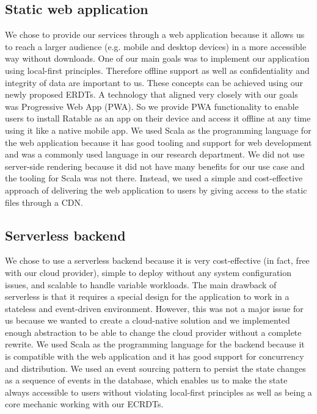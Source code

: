 \documentclass[
	english,
	ruledheaders=section,   %
	class=report,		    %
	thesis={type=bachelor}, %
	accentcolor=9c,			%
	custommargins=true,    %
	marginpar=false,        %
	parskip=half-,          %
	fontsize=11pt,          %
]{tudapub}
\begin{document}
\subsection{Static web application}
We chose to provide our services through a web application because it allows us to reach a larger audience (e.g. mobile and desktop devices) in a more accessible way without downloads. One of our main goals was to implement our application using local-first principles. Therefore offline support as well as confidentiality and integrity of data are important to us. These concepts can be achieved using our newly proposed ERDTs. A technology that aligned very closely with our goals was Progressive Web App (PWA). So we provide PWA functionality to enable users to install Ratable as an app on their device and access it offline at any time using it like a native mobile app. We used Scala as the programming language for the web application because it has good tooling and support for web development and was a commonly used language in our research department. We did not use server-side rendering because it did not have many benefits for our use case and the tooling for Scala was not there. Instead, we used a simple and cost-effective approach of delivering the web application to users by giving access to the static files through a CDN.

\subsection{Serverless backend} 
We chose to use a serverless backend because it is very cost-effective (in fact, free with our cloud provider), simple to deploy without any system configuration issues, and scalable to handle variable workloads. The main drawback of serverless is that it requires a special design for the application to work in a stateless and event-driven environment. However, this was not a major issue for us because we wanted to create a cloud-native solution and we implemented enough abstraction to be able to change the cloud provider without a complete rewrite. We used Scala as the programming language for the backend because it is compatible with the web application and it has good support for concurrency and distribution. We used an event sourcing pattern to persist the state changes as a sequence of events in the database, which enables us to make the state always accessible to users without violating local-first principles as well as being a core mechanic working with our ECRDTs.
\end{document}
